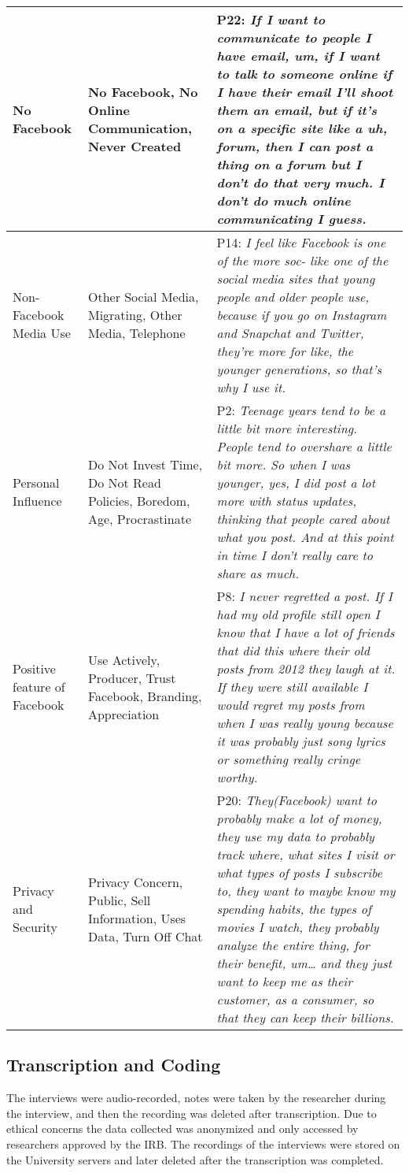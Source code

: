 \begin{table*}[h!]
\begin{tabular}{ |p{4cm}||p{4cm}|p{9cm}| }
 \hline
 No Facebook    & No Facebook, No Online Communication, Never Created& P22: \textit{If I want to communicate to people I have email, um, if I want to talk to someone online if I have their email I'll shoot them an email, but if it's on a specific site like a uh, forum, then I can post a thing on a forum but I don't do that very much. I don't do much online communicating I guess.}\\
 \hline
 Non-Facebook Media Use   & Other Social Media, Migrating, Other Media, Telephone& P14: \textit{I feel like Facebook is one of the more soc- like one of the social media sites that young people and older people use, because if you go on Instagram and Snapchat and Twitter, they're more for like, the younger generations, so that's why I use it.}\\
 \hline
 Personal Influence    & Do Not Invest Time, Do Not Read Policies, Boredom, Age, Procrastinate& P2: \textit{Teenage years tend to be a little bit more interesting. People tend to overshare a little bit more. So when I was younger, yes, I did post a lot more with status updates, thinking that people cared about what you post. And at this point in time I don't really care to share as much. }\\
 \hline
 Positive feature of Facebook    & Use Actively, Producer, Trust Facebook, Branding, Appreciation& P8: \textit{I never regretted a post. If I had my old profile still open I know that I have a lot of friends that did this where their old posts from 2012 they laugh at it. If they were still available I would regret my posts from when I was really young because it was probably just song lyrics or something really cringe worthy.}\\
 \hline
 Privacy and Security    & Privacy Concern, Public, Sell Information, Uses Data, Turn Off Chat& P20: \textit{They(Facebook) want to probably make a lot of money, they use my data to probably track where, what sites I visit or what types of posts I subscribe to, they want to maybe know my spending habits, the types of movies I watch, they probably analyze the entire thing, for their benefit, um… and they just want to keep me as their customer, as a consumer, so that they can keep their billions.}\\ 
 
 \hline
\end{tabular} 
\caption{Table of Code Themes with examples quotes associated with the underline categories}
 \label{table:coding}
\end{table*}
\subsection{Transcription and Coding}
The interviews were audio-recorded, notes were taken by the researcher during the interview, and then the recording was deleted after transcription. Due to ethical concerns the data collected was anonymized and only accessed by researchers approved by the IRB. The recordings of the interviews were stored on the University servers and later deleted after the transcription was completed. 
